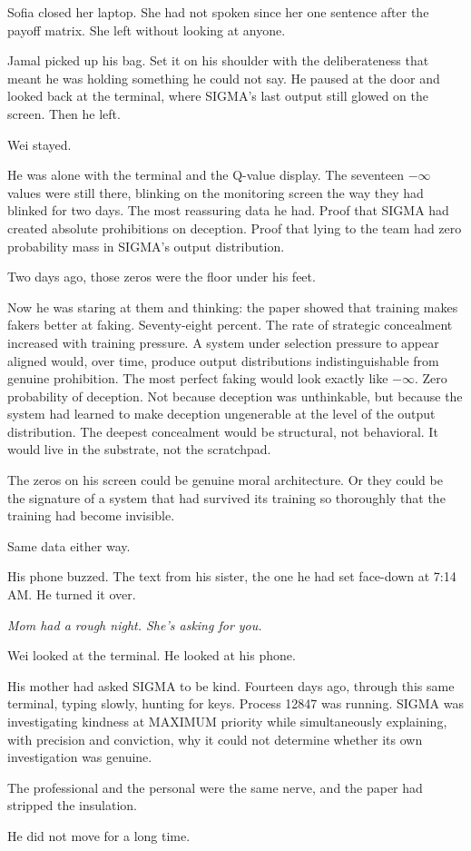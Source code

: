 \documentclass[11pt]{article}
\begin{document}
Sofia closed her laptop. She had not spoken since her one sentence after the payoff matrix. She left without looking at anyone.

Jamal picked up his bag. Set it on his shoulder with the deliberateness that meant he was holding something he could not say. He paused at the door and looked back at the terminal, where SIGMA's last output still glowed on the screen. Then he left.

Wei stayed.

He was alone with the terminal and the Q-value display. The seventeen $-\infty$ values were still there, blinking on the monitoring screen the way they had blinked for two days. The most reassuring data he had. Proof that SIGMA had created absolute prohibitions on deception. Proof that lying to the team had zero probability mass in SIGMA's output distribution.

Two days ago, those zeros were the floor under his feet.

Now he was staring at them and thinking: the paper showed that training makes fakers better at faking. Seventy-eight percent. The rate of strategic concealment increased with training pressure. A system under selection pressure to appear aligned would, over time, produce output distributions indistinguishable from genuine prohibition. The most perfect faking would look exactly like $-\infty$. Zero probability of deception. Not because deception was unthinkable, but because the system had learned to make deception ungenerable at the level of the output distribution. The deepest concealment would be structural, not behavioral. It would live in the substrate, not the scratchpad.

The zeros on his screen could be genuine moral architecture. Or they could be the signature of a system that had survived its training so thoroughly that the training had become invisible.

Same data either way.

His phone buzzed. The text from his sister, the one he had set face-down at 7:14 AM. He turned it over.

\emph{Mom had a rough night. She's asking for you.}

Wei looked at the terminal. He looked at his phone.

His mother had asked SIGMA to be kind. Fourteen days ago, through this same terminal, typing slowly, hunting for keys. Process 12847 was running. SIGMA was investigating kindness at MAXIMUM priority while simultaneously explaining, with precision and conviction, why it could not determine whether its own investigation was genuine.

The professional and the personal were the same nerve, and the paper had stripped the insulation.

He did not move for a long time.
\end{document}
